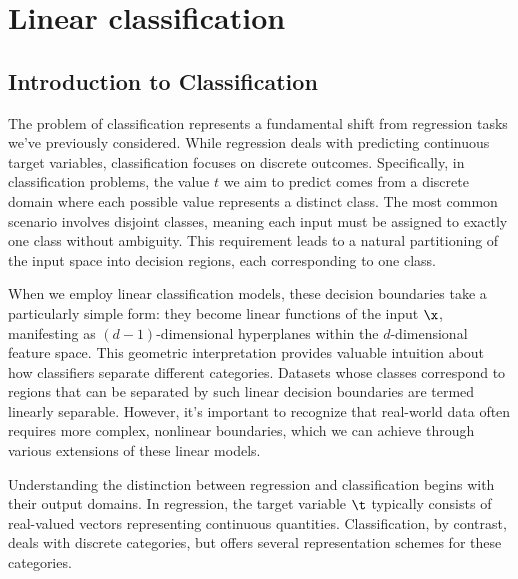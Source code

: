 
\chapter{Linear classification}

\section*{Introduction to Classification}\label{sec:intro}

The problem of classification represents a fundamental shift from regression tasks we've previously considered. While regression deals with predicting continuous target variables, classification focuses on discrete outcomes. Specifically, in classification problems, the value $t$ we aim to predict comes from a discrete domain where each possible value represents a distinct \alert{class}. The most common scenario involves disjoint classes, meaning each input must be assigned to exactly one class without ambiguity. This requirement leads to a natural partitioning of the input space into \alert{decision regions}, each corresponding to one class.

When we employ \alert{linear classification models}, these decision boundaries take a particularly simple form: they become linear functions of the input $\x$, manifesting as $(d-1)$-dimensional hyperplanes within the $d$-dimensional feature space. This geometric interpretation provides valuable intuition about how classifiers separate different categories. Datasets whose classes correspond to regions that can be separated by such linear decision boundaries are termed \alert{linearly separable}. However, it's important to recognize that real-world data often requires more complex, nonlinear boundaries, which we can achieve through various extensions of these linear models.


\medskip
Understanding the distinction between regression and classification begins with their output domains. In regression, the target variable $\t$ typically consists of real-valued vectors representing continuous quantities. Classification, by contrast, deals with discrete categories, but offers several representation schemes for these categories.

